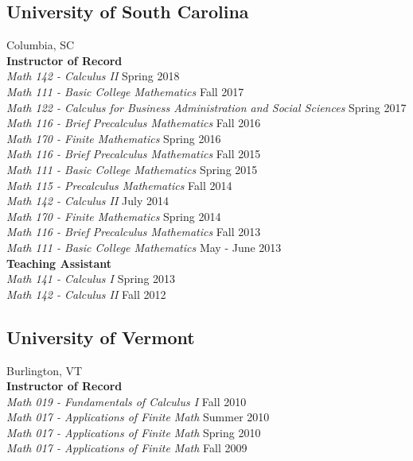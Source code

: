 \documentclass{article}
\begin{document}
\subsection*{University of South Carolina}
\noindent Columbia, SC\\

\noindent\textbf{Instructor of Record}\\
\textsl{Math 142 - Calculus II} \hfill Spring 2018\\
\textsl{Math 111 - Basic College Mathematics} \hfill Fall 2017\\
\textsl{Math 122 - Calculus for Business Administration and Social Sciences} \hfill Spring 2017\\
\textsl{Math 116 - Brief Precalculus Mathematics} \hfill Fall 2016\\
\textsl{Math 170 - Finite Mathematics} \hfill Spring 2016\\
\textsl{Math 116 - Brief Precalculus Mathematics} \hfill Fall 2015\\
\textsl{Math 111 - Basic College Mathematics} \hfill Spring 2015\\
\textsl{Math 115 - Precalculus Mathematics} \hfill Fall 2014\\
\textsl{Math 142 - Calculus II} \hfill July 2014\\
\textsl{Math 170 - Finite Mathematics} \hfill Spring 2014\\
\textsl{Math 116 - Brief Precalculus Mathematics} \hfill Fall 2013\\
\textsl{Math 111 - Basic College Mathematics} \hfill May - June 2013\\

\noindent\textbf{Teaching Assistant}\\
\textsl{Math 141 - Calculus I} \hfill Spring 2013\\
\textsl{Math 142 - Calculus II} \hfill Fall 2012

\subsection*{University of Vermont}
\noindent Burlington, VT\\

\noindent\textbf{Instructor of Record}\\
\textsl{Math 019 - Fundamentals of Calculus I} \hfill Fall 2010\\
\textsl{Math 017 - Applications of Finite Math} \hfill Summer 2010\\
\textsl{Math 017 - Applications of Finite Math} \hfill Spring 2010\\
\textsl{Math 017 - Applications of Finite Math} \hfill Fall 2009\\
\end{document}
